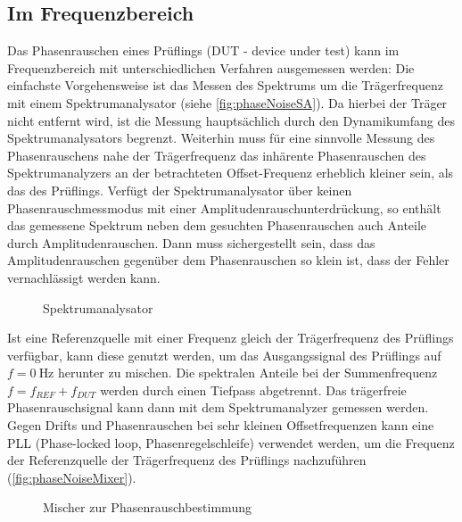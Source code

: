 \subsection{Im Frequenzbereich}
Das Phasenrauschen eines Prüflings (DUT - device under test) kann im Frequenzbereich mit unterschiedlichen Verfahren ausgemessen werden: Die einfachste Vorgehensweise ist das Messen des Spektrums um die Trägerfrequenz mit einem Spektrumanalysator (siehe \autoref{fig:phaseNoiseSA}).
Da hierbei der Träger nicht entfernt wird, ist die Messung hauptsächlich durch den Dynamikumfang des Spektrumanalysators begrenzt. Weiterhin muss für eine sinnvolle Messung des Phasenrauschens nahe der Trägerfrequenz das inhärente Phasenrauschen des Spektrumanalyzers an der betrachteten Offset-Frequenz erheblich kleiner sein, als das des Prüflings. Verfügt der Spektrumanalysator über keinen Phasenrauschmessmodus mit einer Amplitudenrauschunterdrückung, so enthält das gemessene Spektrum neben dem gesuchten Phasenrauschen auch Anteile durch Amplitudenrauschen. Dann muss sichergestellt sein, dass das Amplitudenrauschen gegenüber dem Phasenrauschen so klein ist, dass der Fehler vernachlässigt werden kann. 

\begin{figure}[H]
	\centering
	\caption[Spektrumanalysator]{Spektrumanalysator}
	\label{fig:phaseNoiseSA}
\end{figure}

Ist eine Referenzquelle mit einer Frequenz gleich der Trägerfrequenz des Prüflings verfügbar, kann diese genutzt werden, um das Ausgangssignal des Prüflings auf $f=\SI{0}{\hertz}$ herunter zu mischen. Die spektralen Anteile bei der Summenfrequenz $f=f_{REF}+f_{DUT}$ werden durch einen Tiefpass abgetrennt. Das trägerfreie Phasenrauschsignal kann dann mit dem Spektrumanalyzer gemessen werden.
Gegen Drifts und Phasenrauschen bei sehr kleinen Offsetfrequenzen kann eine PLL (Phase-locked loop, Phasenregelschleife) verwendet werden, um die Frequenz der Referenzquelle der Trägerfrequenz des Prüflings nachzuführen (\autoref{fig:phaseNoiseMixer}).

\begin{figure}[H]
	\centering
	\caption[Mischer zur Phasenrauschmessung]{Mischer zur Phasenrauschbestimmung}
	\label{fig:phaseNoiseMixer}
\end{figure}


